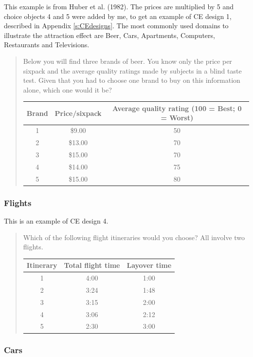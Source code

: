 \documentclass[11pt,letter]{amsart}
\begin{document}
This example is from Huber et al. (1982). The prices are multiplied by 5 and
choice objects 4 and 5 were added by me, to get an example of CE design 1,
described in Appendix \ref{s:CEdesigns}. The most commonly used domains to
illustrate the attraction effect are Beer, Cars, Apartments, Computers,
Restaurants and Televisions.

\begin{quotation}
Below you will find three brands of beer. You know only the price per
sixpack and the average quality ratings made by subjects in a blind taste
test. Given that you had to choose one brand to buy on this information
alone, which one would it be?

\begin{tabular}{ccc}
\hline
Brand & Price/sixpack & Average quality rating (100 = Best; 0 = Worst) \\ 
\hline
1 & \$9.00 & 50 \\ 
2 & \$13.00 & 70 \\ 
3 & \$15.00 & 70 \\ 
4 & \$14.00 & 75 \\ 
5 & \$15.00 & 80 \\ \hline
\end{tabular}
\end{quotation}

\subsubsection{Flights}

This is an example of CE design 4.

\begin{quotation}
Which of the following flight itineraries would you choose? All involve two
flights.

\begin{tabular}{ccc}
\hline
Itinerary & Total flight time & Layover time \\ \hline
1 & 4:00 & 1:00 \\ 
2 & 3:24 & 1:48 \\ 
3 & 3:15 & 2:00 \\ 
4 & 3:06 & 2:12 \\ 
5 & 2:30 & 3:00 \\ \hline
\end{tabular}
\end{quotation}

\subsubsection{Cars}
\end{document}
